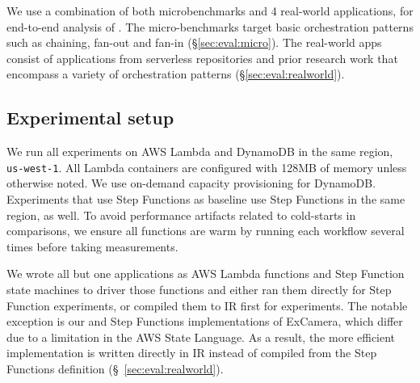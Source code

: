 


We use a combination of both microbenchmarks and 4 real-world applications,
for end-to-end analysis of \name{}. The micro-benchmarks target basic
orchestration patterns such as chaining, fan-out and fan-in
(\S\ref{sec:eval:micro}). The real-world apps consist of applications from
serverless repositories and prior research work  that encompass a variety of
orchestration patterns (\S\ref{sec:eval:realworld}).


\subsection{Experimental setup}

We run all experiments on AWS Lambda and DynamoDB in the same region,
\texttt{us-west-1}. All Lambda containers are configured with 128MB of memory
unless otherwise noted. We use on-demand capacity provisioning for DynamoDB.
Experiments that use Step Functions as baseline use Step Functions in the same
region, as well. To avoid performance artifacts related to cold-starts in
comparisons, we ensure all functions are warm by running each workflow several
times before taking measurements.

We wrote all but one applications as AWS Lambda functions and Step Function
state machines to driver those functions and either ran them directly for Step
Function experiments, or compiled them to \name{} IR first for \name{}
experiments. The notable exception is our \name{} and Step Functions
implementations of ExCamera, which differ due to a limitation in the AWS State
Language. As a result, the more efficient \name{} implementation is written
directly in \name{} IR instead of compiled from the Step Functions definition
(\S~\ref{sec:eval:realworld}).

